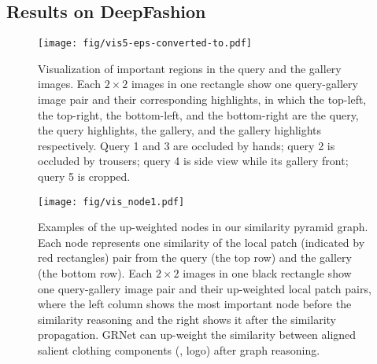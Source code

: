 \documentclass[10pt,twocolumn,letterpaper]{article}
\begin{document}
\subsection{Results on DeepFashion~\cite{Liu2016}}

\begin{figure*}[!t]
\centering
\texttt{[image: fig/vis5-eps-converted-to.pdf]}
\caption{Visualization of important regions in the query and the gallery images. Each $2\times 2$ images in one rectangle show one query-gallery image pair and their corresponding highlights, in which the top-left, the top-right, the bottom-left, and the bottom-right are the query, the query highlights, the gallery, and the gallery highlights respectively. Query 1 and 3 are occluded by hands; query 2 is occluded by trousers; query 4 is side view while its gallery front; query 5 is cropped.}
\label{fig:fig_vis_loc}
\vspace{-2mm}
\end{figure*}

\begin{figure}[!b]
\centering
\texttt{[image: fig/vis\_node1.pdf]}
\caption{Examples of the up-weighted nodes in our similarity pyramid graph. Each node represents one similarity of the local patch (indicated by red rectangles) pair from the query (the top row) and the gallery (the bottom row).     Each $2\times2$ images in one black rectangle show one query-gallery image pair and their up-weighted local patch pairs, where the left column shows the most important node before the similarity reasoning and the right shows it after the similarity propagation. GRNet can up-weight  the similarity between aligned salient clothing components (\eg, logo) after graph reasoning. }
\label{fig:fig_vis_patch}
\vspace{-5mm}
\end{figure}
\end{document}
